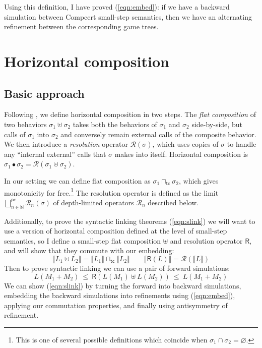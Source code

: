 \documentclass{article}
\newcommand{\kw}[1]{{\mathsf{#1}}}
\begin{document}
Using this definition,
I have proved (\ref{eqn:embed}): if we have a backward simulation between
Compcert small-step semantics,
then we have an alternating refinement between
the corresponding game trees.

\section{Horizontal composition}

\subsection{Basic approach}

Following \cite{cpp15},
we define horizontal composition in two steps.
The \emph{flat composition} of two behaviors $\sigma_1 \uplus \sigma_2$
takes both the behaviors of $\sigma_1$ and $\sigma_2$ side-by-side,
but calls of $\sigma_1$ into $\sigma_2$ and conversely remain
external calls of the composite behavior.
We then introduce a \emph{resolution} operator $\mathcal{R}(\sigma)$,
which uses copies of $\sigma$ to handle any ``internal external'' calls
that $\sigma$ makes into itself.
Horizontal composition is
$\sigma_1 \bullet \sigma_2 = \mathcal{R}(\sigma_1 \uplus \sigma_2)$.

In our setting
we can define flat composition as
$\sigma_1 \sqcap_\kw{tc} \sigma_2$,
which gives monotonicity for free.\footnote{%
This is one of several possible definitions which coincide when
$\sigma_1 \cap \sigma_2 = \varnothing$.}
The resolution operator is defined as the limit
$\bigsqcup^\kw{pc}_{n \in \mathbb{N}} \mathcal{R}_n(\sigma)$
of depth-limited operators $\mathcal{R}_n$ described below.

Additionally,
to prove the syntactic linking theorems (\ref{eqn:slink})
we will want to use a version of horizontal composition
defined at the level of small-step semantics,
so I define a small-step flat composition $\uplus$
and resolution operator $\kw{R}$,
and will show that they commute with our embedding:
\[
  \llbracket L_1 \uplus L_2 \rrbracket =
    \llbracket L_1 \rrbracket \sqcap_\kw{tc}
    \llbracket L_2 \rrbracket
  \qquad
  \llbracket \kw{R}(L) \rrbracket =
    \mathcal{R}(\llbracket L \rrbracket)
\]
Then to prove syntactic linking we can use a pair of forward simulations:
\[
  L(M_1 + M_2) \ \le\  \kw{R}(L(M_1) \uplus L(M_2)) \ \le\  L(M_1 + M_2)
\]
We can show (\ref{eqn:slink}) by
turning the forward into backward simulations,
embedding the backward simulations into refinements using (\ref{eqn:embed}),
applying our commutation properties, and
finally using antisymmetry of refinement.
\end{document}
